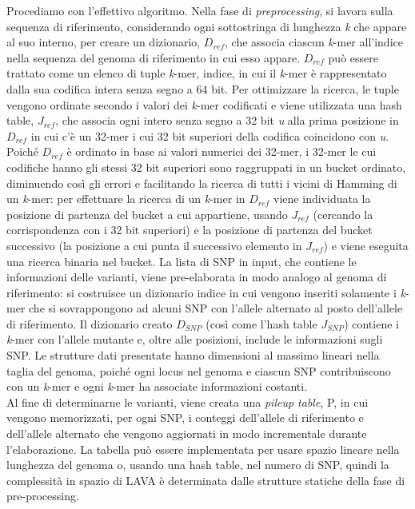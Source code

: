 \documentclass[../main.tex]{subfiles}
\begin{document}
\noindent
Procediamo con l'effettivo algoritmo. Nella fase di \textit{preprocessing}, si lavora sulla sequenza di riferimento, considerando ogni sottostringa di lunghezza \textit{k} che appare al suo interno, per creare un dizionario, $D_{ref}$, che associa ciascun \textit{k}-mer all'indice nella sequenza del genoma di riferimento in cui esso appare. $D_{ref}$ può essere trattato come un elenco di tuple \textlangle \textit{k}-mer, indice\textrangle, in cui il \textit{k}-mer è rappresentato dalla sua codifica intera senza segno a 64 bit. Per ottimizzare la ricerca, le tuple vengono ordinate secondo i valori dei \textit{k}-mer codificati e viene utilizzata una hash table, $J_{ref}$, che associa ogni intero senza segno a 32 bit \textit{u} alla prima posizione in $D_{ref}$ in cui c'è un 32-mer i cui 32 bit superiori della codifica coincidono con \textit{u}. Poiché $D_{ref}$ è ordinato in base ai valori numerici dei 32-mer, i 32-mer le cui codifiche hanno gli stessi 32 bit superiori sono raggruppati in un bucket ordinato, diminuendo così gli errori e facilitando la ricerca di tutti i vicini di Hamming di un \textit{k}-mer: per effettuare la ricerca di un \textit{k}-mer in $D_{ref}$ viene individuata la posizione di partenza del bucket a cui appartiene, usando $J_{ref}$ (cercando la corrispondenza con i 32 bit superiori) e la posizione di partenza del bucket successivo (la posizione a cui punta il successivo elemento in $J_{ref}$) e viene eseguita una ricerca binaria nel bucket. La lista di SNP in input, che contiene le informazioni delle varianti, viene pre-elaborata in modo analogo al genoma di riferimento: si costruisce un dizionario indice in cui vengono inseriti solamente i \textit{k}-mer che si sovrappongono ad alcuni SNP con l'allele alternato al posto dell'allele di riferimento. Il dizionario creato $D_{SNP}$ (così come l'hash table $J_{SNP}$) contiene i \textit{k}-mer con l'allele mutante e, oltre alle posizioni, include le informazioni sugli SNP. Le strutture dati presentate hanno dimensioni al massimo lineari nella taglia del genoma, poiché ogni locus nel genoma e ciascun SNP contribuiscono con un \textit{k}-mer e ogni \textit{k}-mer ha associate informazioni costanti.\\

\noindent
Al fine di determinarne le varianti, viene creata una \textit{pileup table}, P, in cui vengono memorizzati, per ogni SNP, i conteggi dell'allele di riferimento e dell'allele alternato che vengono aggiornati in modo incrementale durante l'elaborazione. La tabella può essere implementata per usare spazio lineare nella lunghezza del genoma o, usando una hash table, nel numero di SNP, quindi la complessità in spazio di LAVA è determinata dalle strutture statiche della fase di pre-processing.
\end{document}
